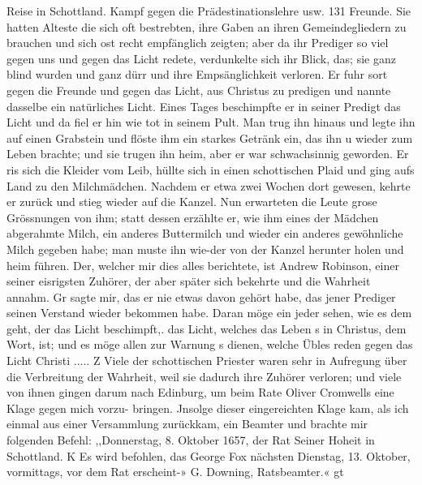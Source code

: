 Reise in Schottland. Kampf gegen die Prädestinationslehre usw. 131
Freunde. Sie hatten Alteste die sich oft bestrebten, ihre Gaben
an ihren Gemeindegliedern zu brauchen und sich ost recht empfänglich
zeigten; aber da ihr Prediger so viel gegen uns und gegen das
Licht redete, verdunkelte sich ihr Blick, das; sie ganz blind wurden
und ganz dürr und ihre Empsänglichkeit verloren. Er fuhr sort
gegen die Freunde und gegen das Licht, aus Christus zu
predigen und nannte dasselbe ein natürliches Licht. Eines Tages
beschimpfte er in seiner Predigt das Licht und da fiel er hin wie
tot in seinem Pult. Man trug ihn hinaus und legte ihn auf
einen Grabstein und flöste ihm ein starkes Getränk ein, das ihn u
wieder zum Leben brachte; und sie trugen ihn heim, aber er war
schwachsinnig geworden. Er ris sich die Kleider vom Leib, hüllte
sich in einen schottischen Plaid und ging aufs Land zu den
Milchmädchen. Nachdem er etwa zwei Wochen dort gewesen,
kehrte er zurück und stieg wieder auf die Kanzel. Nun erwarteten
die Leute grose Grössnungen von ihm; statt dessen erzählte er,
wie ihm eines der Mädchen abgerahmte Milch, ein anderes
Buttermilch und wieder ein anderes gewöhnliche Milch gegeben
habe; man muste ihn wie-der von der Kanzel herunter holen und
heim führen. Der, welcher mir dies alles berichtete, ist Andrew
Robinson, einer seiner eisrigsten Zuhörer, der aber später sich
bekehrte und die Wahrheit annahm. Gr sagte mir, das er nie
etwas davon gehört habe, das jener Prediger seinen Verstand
wieder bekommen habe. Daran möge ein jeder sehen, wie es
dem geht, der das Licht beschimpft,. das Licht, welches das Leben s
in Christus, dem Wort, ist; und es möge allen zur Warnung s
dienen, welche Übles reden gegen das Licht Christi ..... Z
Viele der schottischen Priester waren sehr in Aufregung über
die Verbreitung der Wahrheit, weil sie dadurch ihre Zuhörer
verloren; und viele von ihnen gingen darum nach Edinburg,
um beim Rate Oliver Cromwells eine Klage gegen mich vorzu-
bringen. Jnsolge dieser eingereichten Klage kam, als ich einmal
aus einer Versammlung zurückkam, ein Beamter und brachte mir
folgenden Befehl:
,,Donnerstag, 8. Oktober 1657, der Rat Seiner Hoheit in
Schottland.
K Es wird befohlen, das George Fox nächsten Dienstag,
13. Oktober, vormittags, vor dem Rat erscheint-»
G. Downing, Ratsbeamter.«
gt



